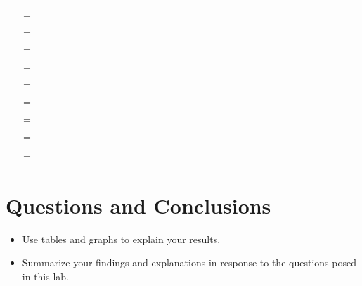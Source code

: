 \documentclass[a4paper]{article}
\begin{document}
\begin{itemize}
\begin{tabular}{|c|c|c|}
	      	\hline
          \end{tabular} 
          \begin{tabular}{rcl}
            & $=$ &   \\
            & $=$ &   \\
            & $=$ &   \\
            & $=$ &   \\
            & $=$ &   \\
            & $=$ &   \\
            & $=$ &   \\
            & $=$ &   \\
            & $=$ &   \\
      \end{tabular}
\end{itemize}

\section*{Questions and Conclusions}
\begin{itemize}
	\item Use tables and graphs to explain your results.
	\item Summarize your findings and explanations in response to the questions posed in this lab.
\end{itemize}

  
\end{document}
